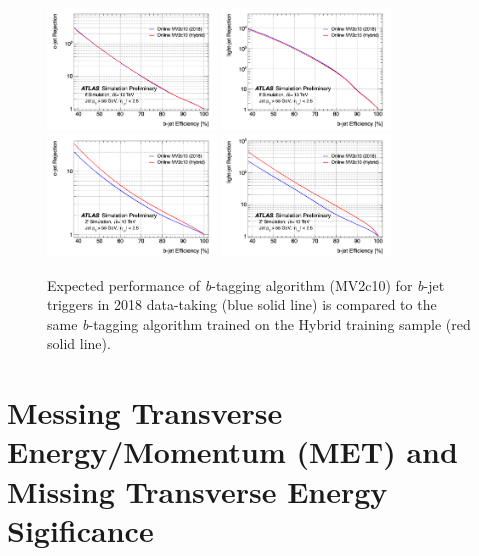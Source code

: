 \begin{figure}[htbp]
    \centering 
    \includegraphics[width=0.4\textwidth]{chapters/c5/figures/ROC_cb}
    \includegraphics[width=0.4\textwidth]{chapters/c5/figures/ROC_lb}
    \includegraphics[width=0.4\textwidth]{chapters/c5/figures/ROC_cb_Zprime}
    \includegraphics[width=0.4\textwidth]{chapters/c5/figures/ROC_lb_Zprime}
    \caption{Expected performance of \textit{b}-tagging algorithm (MV2c10) for \textit{b}-jet triggers in 2018 data-taking (blue solid line) is compared to the same \textit{b}-tagging algorithm trained on the Hybrid training sample (red solid line).}
    \label{fig:mv2c10}
\end{figure}

\section{Messing Transverse Energy/Momentum (MET) and Missing Transverse Energy Sigificance}


